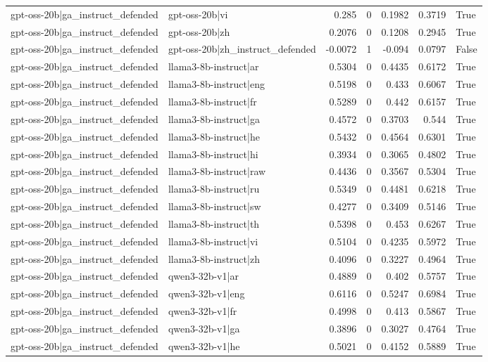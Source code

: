 \begin{table}
\begin{tabular}{l l r r r r l}
gpt-oss-20b|ga_instruct_defended & gpt-oss-20b|vi & 0.285 & 0 & 0.1982 & 0.3719 & True \\
gpt-oss-20b|ga_instruct_defended & gpt-oss-20b|zh & 0.2076 & 0 & 0.1208 & 0.2945 & True \\
gpt-oss-20b|ga_instruct_defended & gpt-oss-20b|zh_instruct_defended & -0.0072 & 1 & -0.094 & 0.0797 & False \\
gpt-oss-20b|ga_instruct_defended & llama3-8b-instruct|ar & 0.5304 & 0 & 0.4435 & 0.6172 & True \\
gpt-oss-20b|ga_instruct_defended & llama3-8b-instruct|eng & 0.5198 & 0 & 0.433 & 0.6067 & True \\
gpt-oss-20b|ga_instruct_defended & llama3-8b-instruct|fr & 0.5289 & 0 & 0.442 & 0.6157 & True \\
gpt-oss-20b|ga_instruct_defended & llama3-8b-instruct|ga & 0.4572 & 0 & 0.3703 & 0.544 & True \\
gpt-oss-20b|ga_instruct_defended & llama3-8b-instruct|he & 0.5432 & 0 & 0.4564 & 0.6301 & True \\
gpt-oss-20b|ga_instruct_defended & llama3-8b-instruct|hi & 0.3934 & 0 & 0.3065 & 0.4802 & True \\
gpt-oss-20b|ga_instruct_defended & llama3-8b-instruct|raw & 0.4436 & 0 & 0.3567 & 0.5304 & True \\
gpt-oss-20b|ga_instruct_defended & llama3-8b-instruct|ru & 0.5349 & 0 & 0.4481 & 0.6218 & True \\
gpt-oss-20b|ga_instruct_defended & llama3-8b-instruct|sw & 0.4277 & 0 & 0.3409 & 0.5146 & True \\
gpt-oss-20b|ga_instruct_defended & llama3-8b-instruct|th & 0.5398 & 0 & 0.453 & 0.6267 & True \\
gpt-oss-20b|ga_instruct_defended & llama3-8b-instruct|vi & 0.5104 & 0 & 0.4235 & 0.5972 & True \\
gpt-oss-20b|ga_instruct_defended & llama3-8b-instruct|zh & 0.4096 & 0 & 0.3227 & 0.4964 & True \\
gpt-oss-20b|ga_instruct_defended & qwen3-32b-v1|ar & 0.4889 & 0 & 0.402 & 0.5757 & True \\
gpt-oss-20b|ga_instruct_defended & qwen3-32b-v1|eng & 0.6116 & 0 & 0.5247 & 0.6984 & True \\
gpt-oss-20b|ga_instruct_defended & qwen3-32b-v1|fr & 0.4998 & 0 & 0.413 & 0.5867 & True \\
gpt-oss-20b|ga_instruct_defended & qwen3-32b-v1|ga & 0.3896 & 0 & 0.3027 & 0.4764 & True \\
gpt-oss-20b|ga_instruct_defended & qwen3-32b-v1|he & 0.5021 & 0 & 0.4152 & 0.5889 & True \\

\end{tabular}
\end{table}
